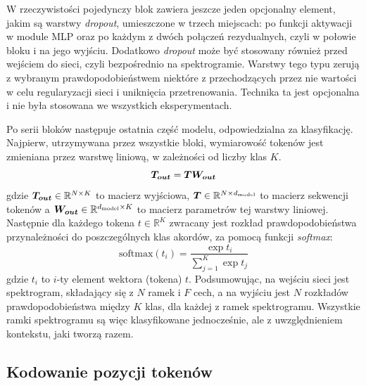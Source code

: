 W rzeczywistości pojedynczy blok zawiera jeszcze jeden opcjonalny element, jakim są warstwy
\emph{dropout}, umieszczone w trzech miejscach: po funkcji aktywacji w module MLP oraz po każdym z
dwóch połączeń rezydualnych, czyli w połowie bloku i na jego wyjściu. Dodatkowo \emph{dropout} może
być stosowany również przed wejściem do sieci, czyli bezpośrednio na spektrogramie. Warstwy tego
typu zerują z wybranym prawdopodobieństwem niektóre z przechodzących przez nie wartości w celu
regularyzacji sieci i uniknięcia przetrenowania. Technika ta jest opcjonalna i nie była stosowana we
wszystkich eksperymentach.

Po serii bloków następuje ostatnia część modelu, odpowiedzialna za klasyfikację. Najpierw,
utrzymywana przez wszystkie bloki, wymiarowość tokenów jest zmieniana przez warstwę liniową, w
zależności od liczby klas $K$.
\begin{equation}
    \boldsymbol{T_{out}} = \boldsymbol{T} \boldsymbol{W_{out}}
\end{equation}
gdzie $\boldsymbol{T_{out}} \in \mathbb{R}^{N \times K}$ to macierz wyjściowa, $\boldsymbol{T} \in \mathbb{R}^{N \times d_{\mathrm{model}}}$ to
macierz sekwencji tokenów a $\boldsymbol{W_{out}} \in \mathbb{R}^{d_{\mathrm{model}} \times K}$ to macierz parametrów tej
warstwy liniowej. Następnie dla każdego tokena $t \in \mathbb{R}^K$ zwracany jest rozkład
prawdopodobieństwa przynależności do poszczególnych klas akordów, za pomocą funkcji \emph{softmax}:
\begin{equation}
    \textrm{softmax}(t_i) = \frac{\exp{t_i}}{\sum_{j=1}^{K}\exp{t_j}}
\end{equation}
gdzie $t_i$ to $i$-ty element wektora (tokena) $t$. Podsumowując, na wejściu sieci jest spektrogram,
składający się z $N$ ramek i $F$ cech, a na wyjściu jest $N$ rozkładów prawdopodobieństwa między $K$
klas, dla każdej z ramek spektrogramu. Wszystkie ramki spektrogramu są więc klasyfikowane
jednocześnie, ale z uwzględnieniem kontekstu, jaki tworzą razem.

\subsection{Kodowanie pozycji tokenów}


